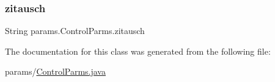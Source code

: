 \subsubsection{\texorpdfstring{zitausch}{zitausch}}
{\footnotesize\ttfamily String params.\+Control\+Parms.\+zitausch\hspace{0.3cm}{\ttfamily [private]}}



The documentation for this class was generated from the following file\+:\begin{DoxyCompactItemize}
\item 
params/\hyperlink{_control_parms_8java}{Control\+Parms.\+java}\end{DoxyCompactItemize}
